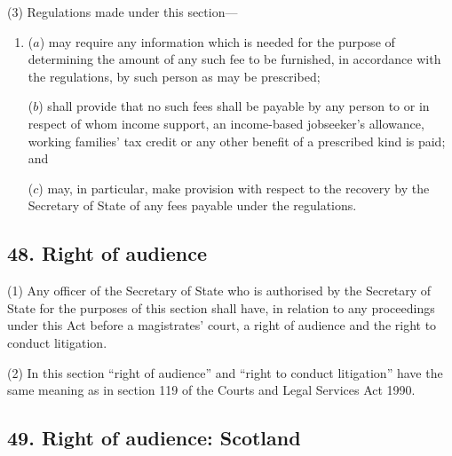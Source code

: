 \documentclass[12pt,a4paper]{article}
\begin{document}
(3) Regulations made under this section—
\begin{enumerate}\item[]
($a$) may require any information which is needed for the purpose of determining the amount of any such fee to be furnished, in accordance with the regulations, by such person as may be prescribed;

($b$) shall provide that no such fees shall be payable by any person to or in respect of whom income support, 
an income-based jobseeker’s allowance,  %
working families' tax credit  %
or any other benefit of a prescribed kind is paid; and

($c$) may, in particular, make provision with respect to the recovery by the Secretary of State of any fees payable under the regulations.
\end{enumerate}


\subsection{48. Right of audience}

(1) Any 
officer of the Secretary of State who is authorised  %
by the Secretary of State for the purposes of this section shall have, in relation to any proceedings under this Act before a magistrates' court, a right of audience and the right to conduct litigation.

(2) In this section “right of audience” and “right to conduct litigation” have the same meaning as in section 119 of the Courts and Legal Services Act 1990.


\subsection{49. Right of audience: Scotland}
\end{document}
